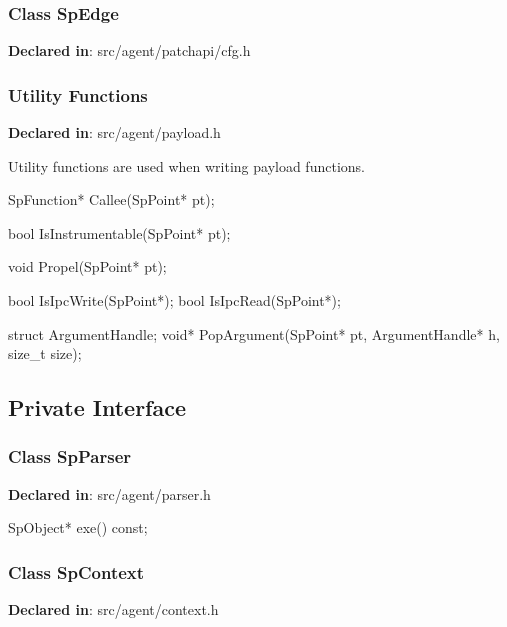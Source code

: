 \subsubsection{Class SpEdge}
\textbf{Declared in}: src/agent/patchapi/cfg.h


\subsubsection{Utility Functions}
\textbf{Declared in}: src/agent/payload.h

Utility functions are used when writing payload functions.

\begin{apient}
SpFunction* Callee(SpPoint* pt);
\end{apient}

\begin{apient}
bool IsInstrumentable(SpPoint* pt);
\end{apient}
\apidesc{
}

\begin{apient}
void Propel(SpPoint* pt);
\end{apient}
\apidesc{
}

\begin{apient}
bool IsIpcWrite(SpPoint*); 
bool IsIpcRead(SpPoint*); 
\end{apient}
\apidesc{
}

\begin{apient}
struct ArgumentHandle;
void* PopArgument(SpPoint* pt,
                  ArgumentHandle* h,
                  size_t size);
\end{apient}
\apidesc{
}

\subsection{Private Interface}
\subsubsection{Class SpParser}
\textbf{Declared in}: src/agent/parser.h

\begin{apient}
SpObject* exe() const;
\end{apient}
\apidesc{
}

\subsubsection{Class SpContext}
\textbf{Declared in}: src/agent/context.h

